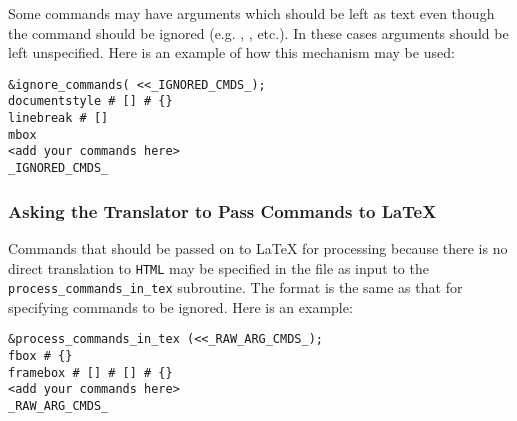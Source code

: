 Some commands may have arguments which should be left as text even
though the command should be ignored 
(e.g. , , etc.). 
In these cases arguments should be left unspecified.
Here is an example of how this mechanism may be used:
\begin{small}
\begin{verbatim}
&ignore_commands( <<_IGNORED_CMDS_);
documentstyle # [] # {}
linebreak # []
mbox
<add your commands here>
_IGNORED_CMDS_
\end{verbatim}
\end{small}


\subsubsection{Asking the Translator to Pass Commands to \LaTeX\label{pass}}%
\html{\\}%
Commands that should be passed on to \LaTeX{}  for processing because
there is no direct translation to \texttt{HTML} may be specified in the 
file as input to the \verb|process_commands_in_tex| subroutine.
The format is the same as that for specifying commands to be ignored.
Here is an example:
\begin{small}
\begin{verbatim}
&process_commands_in_tex (<<_RAW_ARG_CMDS_);
fbox # {}
framebox # [] # [] # {}
<add your commands here>
_RAW_ARG_CMDS_
\end{verbatim}
\end{small}


